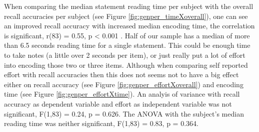 \documentclass[a4paper,man,natbib,floatsintext,import]{apa6}
\begin{document}
When comparing the median statement reading time per subject with the overall recall accuracies per subject (see Figure \ref{fig:genper_timeXoverall}), one can see an improved recall accuracy with increased median encoding time, the correlation is significant, r(83) = 0.55, p < 0.001 . Half of our sample has a median of more than 6.5 seconds reading time for a single statement. This could be enough time to take notes (a little over 2 seconds per item), or just really put a lot of effort into encoding those two or three items. Although when comparing self reported effort with recall accuracies then this does not seems not to have a big effect either on recall accuracy (see Figure \ref{fig:genper_effortXoverall}) and encoding time (see Figure \ref{fig:genper_effortXtime}). An analyis of variance with recall accuracy as dependent variable and effort as independent variable was not significant, F(1,83) = 0.24, p = 0.626. The ANOVA with the subject's median reading time was neither significant, F(1,83) = 0.83, p = 0.364.
\end{document}
